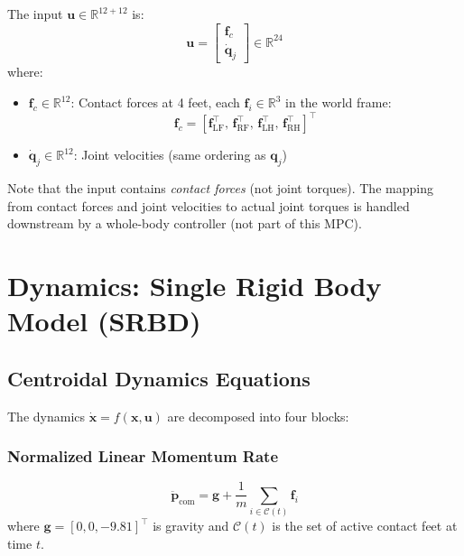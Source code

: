 \documentclass[11pt,a4paper]{article}
\newcommand{\R}{\mathbb{R}}
\begin{document}
The input $\bm{u} \in \R^{12+12}$ is:
\begin{equation}
	\bm{u} = \begin{bmatrix} \bm{f}_c \\ \dot{\bm{q}}_j \end{bmatrix}
	\in \R^{24}
\end{equation}
where:
\begin{itemize}
	\item $\bm{f}_c \in \R^{12}$: Contact forces at 4 feet, each $\bm{f}_i \in \R^3$ in the world frame:
	      \begin{equation*}
		      \bm{f}_c = [\bm{f}_{\text{LF}}^\top,\, \bm{f}_{\text{RF}}^\top,\, \bm{f}_{\text{LH}}^\top,\, \bm{f}_{\text{RH}}^\top]^\top
	      \end{equation*}
	\item $\dot{\bm{q}}_j \in \R^{12}$: Joint velocities (same ordering as $\bm{q}_j$)
\end{itemize}

\noindent Note that the input contains \emph{contact forces} (not joint torques). The mapping from contact forces and joint velocities to actual joint torques is handled downstream by a whole-body controller (not part of this MPC).


\section{Dynamics: Single Rigid Body Model (SRBD)}
\label{sec:dynamics}

\subsection{Centroidal Dynamics Equations}

The dynamics $\dot{\bm{x}} = f(\bm{x}, \bm{u})$ are decomposed into four blocks:

\subsubsection{Normalized Linear Momentum Rate}

\begin{equation}
	\boxed{
		\ddot{\bm{p}}_{\text{com}} = \bm{g} + \frac{1}{m}\sum_{i \in \mathcal{C}(t)} \bm{f}_i
	}
\end{equation}
where $\bm{g} = [0, 0, -9.81]^\top$ is gravity and $\mathcal{C}(t)$ is the set of active contact feet at time $t$.
\end{document}
